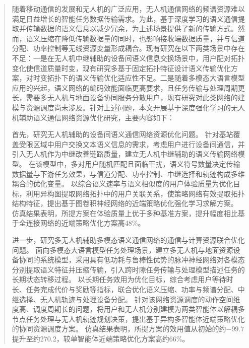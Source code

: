 

\begin{abstract}
\linespread{1.33}\selectfont
随着移动通信的发展和无人机的广泛应用，无人机通信网络的频谱资源难以满足日益增长的智能任务数据传输需求。为此，基于深度学习的语义通信提取并传输数据的语义信息以减少冗余，为上述场景提供了新的传输方式。然而，语义压缩在降低传输数据量的同时，也影响接收端数据质量，并与信道分配、功率控制等无线资源变量形成耦合。现有研究在以下两类场景中存在不足：一是在无人机中继辅助的设备间语义信息交换场景中，用户配对拓扑变化使信道质量时变，现有研究多基于固定拓扑特征设计语义传输优化方案，对时变拓扑下的语义传输优化适应性不足。二是随着多模态大语言模型应用的兴起，语义网络的编码效能面临更高要求，且任务传输与处理周期更长，需要多无人机与地面设备协同服务分散用户，现有研究对此类网络的建模与资源调度尚未涉及。针对上述问题，本文开展基于深度强化学习的无人机辅助语义通信网络资源优化研究，主要内容如下：

首先，研究无人机辅助的设备间语义通信网络资源优化问题。
针对基站覆盖受限区域中用户交换文本语义信息的需求，考虑用户进行设备间通信，并引入无人机作为中继改善链路质量，建立无人机中继辅助的语义传输网络模型。
在该模型中，多对用户随机匹配且面临干扰，语义符号数量决定传输数据量与下游任务效果，与信道分配、功率控制、中继选择和轨迹构成多维耦合的优化变量。
以综合语义速率与语义相似度的用户体验质量为优化目标，利用异构图提取网络拓扑中的用户关联关系，使策略网络有效提取拓扑结构特征，提出基于图卷积神经网络的近端策略优化强化学习求解方案。
仿真结果表明，所提方案在体验质量上优于多种基准方案，提升幅度相比基于全连接网络的近端策略优化方案高48\%。

进一步，研究多无人机辅助多模态语义通信网络的通信与计算资源联合优化问题。
面向多模态大语言模型任务处理场景，建立多无人机与地面资源设备协同的系统模型，采用具有低功耗与鲁棒性优势的脉冲神经网络对各模态分别提取语义特征并压缩传输，引入跨时隙任务传输与处理模型描述任务的长期状态转移过程。
以长期任务效用为优化目标，综合考虑用户等待时长、任务完成代价与奖励等指标，联合优化语义压缩、功率与频谱分配、中继选择、无人机轨迹与处理设备分配。
针对该网络资源调度的动作空间维度高、调度周期长的问题，将用户和无人机分别建模为两类智能体以解耦多节点任务处理与无人机轨迹规划决策，提出基于异构多智能体近端策略优化的协同资源调度方案。
仿真结果表明，所提方案的效用值从初始的约$-99.7$提升至约270.2，较单智能体近端策略优化方案高约66\%。
\end{abstract}

